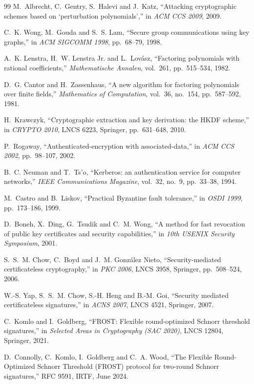 \begin{thebibliography}{99}
 M.~Albrecht, C.~Gentry, S.~Halevi and J.~Katz, ``Attacking cryptographic schemes based on `perturbation polynomials','' in
\emph{ACM CCS 2009}, 2009.

 C.~K. Wong, M.~Gouda and S.~S. Lam, ``Secure group communications using key graphs,'' in \emph{ACM SIGCOMM 1998}, pp.~68--79, 1998.

 A.~K. Lenstra, H.~W. Lenstra Jr. and L.~Lov\'asz, ``Factoring polynomials with rational coefficients,'' \emph{Mathematische Annalen},
vol.~261, pp.~515--534, 1982.

 D.~G. Cantor and H.~Zassenhaus, ``A new algorithm for factoring polynomials over finite fields,'' \emph{Mathematics of Computation},
vol.~36, no.~154, pp.~587--592, 1981.

 H.~Krawczyk, ``Cryptographic extraction and key derivation: the HKDF scheme,'' in \emph{CRYPTO 2010}, LNCS 6223, Springer,
pp.~631--648, 2010.

 P.~Rogaway, ``Authenticated-encryption with associated-data,'' in \emph{ACM CCS 2002}, pp.~98--107, 2002.

 B.~C. Neuman and T.~Ts'o, ``Kerberos: an authentication service for computer networks,'' \emph{IEEE Communications Magazine},
vol.~32, no.~9, pp.~33--38, 1994.

 M.~Castro and B.~Liskov, ``Practical Byzantine fault tolerance,'' in \emph{OSDI 1999}, pp.~173--186, 1999.

 D.~Boneh, X.~Ding, G.~Tsudik and C.~M. Wong, ``A method for fast revocation of public key certificates and security capabilities,''
in \emph{10th USENIX Security Symposium}, 2001.

 S.~S.~M. Chow, C.~Boyd and J.~M. Gonz\'alez Nieto, ``Security-mediated certificateless cryptography,'' in \emph{PKC 2006}, LNCS 3958,
Springer, pp.~508--524, 2006.

 W.-S. Yap, S.~S.~M. Chow, S.-H. Heng and B.-M. Goi, ``Security mediated certificateless signatures,'' in \emph{ACNS 2007}, LNCS 4521,
Springer, 2007.

 C.~Komlo and I.~Goldberg, ``FROST: Flexible round-optimized Schnorr threshold signatures,'' in \emph{Selected Areas in Cryptography
(SAC 2020)}, LNCS 12804, Springer, 2021.

 D.~Connolly, C.~Komlo, I.~Goldberg and C.~A. Wood, ``The Flexible Round-Optimized Schnorr Threshold (FROST) protocol for two-round
Schnorr signatures,'' RFC 9591, IRTF, June 2024.


\end{thebibliography}

